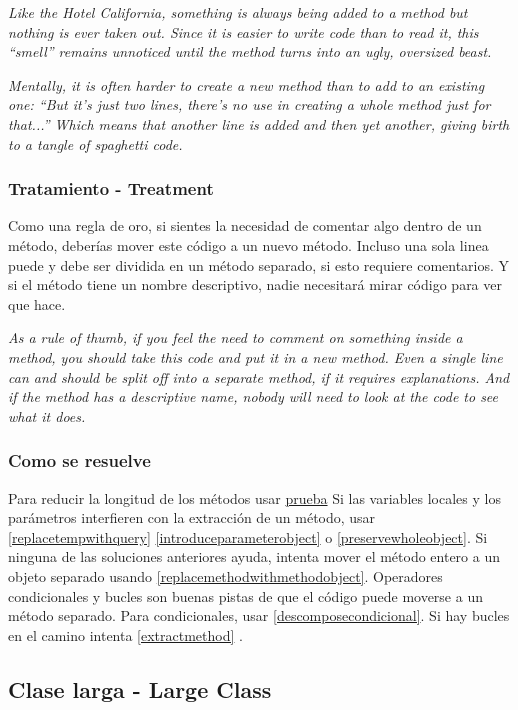 \documentclass[11pt,a4paper,oneside]{book}
\begin{document}
\textit{Like the Hotel California, something is always being added to a method but nothing is ever taken out. Since it is easier to write code than to read it, this “smell” remains unnoticed until the method turns into an ugly, oversized beast.}

\textit{Mentally, it is often harder to create a new method than to add to an existing one: “But it’s just two lines, there’s no use in creating a whole method just for that...” Which means that another line is added and then yet another, giving birth to a tangle of spaghetti code.}

\subsubsection{Tratamiento - Treatment}
Como una regla de oro, si sientes la necesidad de comentar algo dentro de un método, deberías mover este código a un nuevo método. Incluso una sola linea puede y debe ser dividida en un método separado, si esto requiere comentarios. Y si el método tiene un nombre descriptivo, nadie necesitará mirar código para ver que hace.

\textit{As a rule of thumb, if you feel the need to comment on something inside a method, you should take this code and put it in a new method. Even a single line can and should be split off into a separate method, if it requires explanations. And if the method has a descriptive name, nobody will need to look at the code to see what it does.}

\subsubsection{Como se resuelve}
  Para reducir la longitud de los métodos usar  \hyperref[sec:extractmethod]{prueba}
  Si las variables locales y los parámetros interfieren con la extracción de un método, usar \ref{replacetempwithquery}
  \ref{introduceparameterobject} o \ref{preservewholeobject}.
  Si ninguna de las soluciones anteriores ayuda, intenta mover el método entero a un objeto separado usando \ref{replacemethodwithmethodobject}.
  Operadores condicionales y bucles son buenas pistas de que el código puede moverse a un método separado. Para condicionales, usar \ref{descomposecondicional}. Si hay bucles en el camino intenta \ref{extractmethod} .





\subsection{Clase larga -   Large Class}
\end{document}
